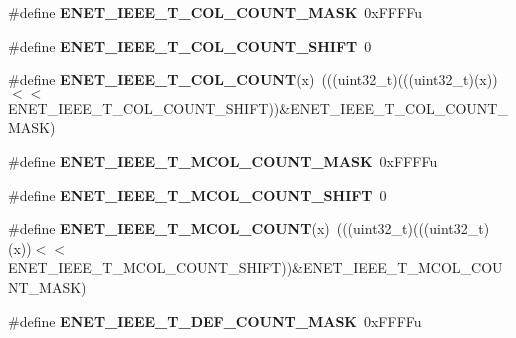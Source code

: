 \begin{DoxyCompactItemize}
\item 
\#define {\bfseries E\+N\+E\+T\+\_\+\+I\+E\+E\+E\+\_\+\+T\+\_\+C\+O\+L\+\_\+\+C\+O\+U\+N\+T\+\_\+\+M\+A\+SK}~0x\+F\+F\+F\+Fu\hypertarget{group__ENET__Register__Masks_ga7306aeb15187e2182972050a1dad04f1}{}\label{group__ENET__Register__Masks_ga7306aeb15187e2182972050a1dad04f1}

\item 
\#define {\bfseries E\+N\+E\+T\+\_\+\+I\+E\+E\+E\+\_\+\+T\+\_\+C\+O\+L\+\_\+\+C\+O\+U\+N\+T\+\_\+\+S\+H\+I\+FT}~0\hypertarget{group__ENET__Register__Masks_ga5d76cc219ed04226ca7b8049d9acf2d6}{}\label{group__ENET__Register__Masks_ga5d76cc219ed04226ca7b8049d9acf2d6}

\item 
\#define {\bfseries E\+N\+E\+T\+\_\+\+I\+E\+E\+E\+\_\+\+T\+\_\+C\+O\+L\+\_\+\+C\+O\+U\+NT}(x)~(((uint32\+\_\+t)(((uint32\+\_\+t)(x))$<$$<$E\+N\+E\+T\+\_\+\+I\+E\+E\+E\+\_\+\+T\+\_\+C\+O\+L\+\_\+\+C\+O\+U\+N\+T\+\_\+\+S\+H\+I\+FT))\&E\+N\+E\+T\+\_\+\+I\+E\+E\+E\+\_\+\+T\+\_\+C\+O\+L\+\_\+\+C\+O\+U\+N\+T\+\_\+\+M\+A\+SK)\hypertarget{group__ENET__Register__Masks_gae4425db78c38e5e711a6fbcf76808d9d}{}\label{group__ENET__Register__Masks_gae4425db78c38e5e711a6fbcf76808d9d}

\item 
\#define {\bfseries E\+N\+E\+T\+\_\+\+I\+E\+E\+E\+\_\+\+T\+\_\+\+M\+C\+O\+L\+\_\+\+C\+O\+U\+N\+T\+\_\+\+M\+A\+SK}~0x\+F\+F\+F\+Fu\hypertarget{group__ENET__Register__Masks_ga8c5aa3e3b3754724a33b871ec266dfae}{}\label{group__ENET__Register__Masks_ga8c5aa3e3b3754724a33b871ec266dfae}

\item 
\#define {\bfseries E\+N\+E\+T\+\_\+\+I\+E\+E\+E\+\_\+\+T\+\_\+\+M\+C\+O\+L\+\_\+\+C\+O\+U\+N\+T\+\_\+\+S\+H\+I\+FT}~0\hypertarget{group__ENET__Register__Masks_gafc71cbe43a3a04af9ab56efe38f08b82}{}\label{group__ENET__Register__Masks_gafc71cbe43a3a04af9ab56efe38f08b82}

\item 
\#define {\bfseries E\+N\+E\+T\+\_\+\+I\+E\+E\+E\+\_\+\+T\+\_\+\+M\+C\+O\+L\+\_\+\+C\+O\+U\+NT}(x)~(((uint32\+\_\+t)(((uint32\+\_\+t)(x))$<$$<$E\+N\+E\+T\+\_\+\+I\+E\+E\+E\+\_\+\+T\+\_\+\+M\+C\+O\+L\+\_\+\+C\+O\+U\+N\+T\+\_\+\+S\+H\+I\+FT))\&E\+N\+E\+T\+\_\+\+I\+E\+E\+E\+\_\+\+T\+\_\+\+M\+C\+O\+L\+\_\+\+C\+O\+U\+N\+T\+\_\+\+M\+A\+SK)\hypertarget{group__ENET__Register__Masks_ga4cc2d69b86d1de93eb581bb43d37b243}{}\label{group__ENET__Register__Masks_ga4cc2d69b86d1de93eb581bb43d37b243}

\item 
\#define {\bfseries E\+N\+E\+T\+\_\+\+I\+E\+E\+E\+\_\+\+T\+\_\+\+D\+E\+F\+\_\+\+C\+O\+U\+N\+T\+\_\+\+M\+A\+SK}~0x\+F\+F\+F\+Fu\hypertarget{group__ENET__Register__Masks_gaa51a7b5a53afb1d47cba1d900f9bf34f}{}\label{group__ENET__Register__Masks_gaa51a7b5a53afb1d47cba1d900f9bf34f}


\end{DoxyCompactItemize}
